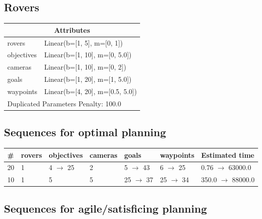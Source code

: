 \documentclass{article}
\begin{document}
                            \newpage \subsection{Rovers}
                    \begin{center}
                    \begin{tabular}{@{}p{}p{}@{}}
                    \multicolumn{2}{c}{\bf \large Attributes}\\\midrule
                    rovers & Linear(b=[1, 5], m=[0, 1])\\
objectives & Linear(b=[1, 10], m=[0, 5.0])\\
cameras & Linear(b=[1, 10], m=[0, 2])\\
goals & Linear(b=[1, 20], m=[1, 5.0])\\
waypoints & Linear(b=[4, 20], m=[0.5, 5.0]) \\\midrule
                    \multicolumn{2}{l}{Duplicated Parameters Penalty: 100.0}
                    \end{tabular}
                    \end{center}
                
                            \subsection*{Sequences for optimal planning}

                            \begin{center}
                            \begin{tabular}{@{}l|l|l|l|l|l|l@{}}
                            \# & rovers & objectives & cameras & goals & waypoints & Estimated time\\\midrule
                            20&1&4 $\rightarrow$ 25&2&5 $\rightarrow$ 43&6 $\rightarrow$ 25&0.76 $\rightarrow$ 63000.0\\
10&1&5&5&25 $\rightarrow$ 37&25 $\rightarrow$ 34&350.0 $\rightarrow$ 88000.0
                            \end{tabular}
                            \end{center}
                    
                         \subsection*{Sequences for agile/satisficing planning}
\end{document}
